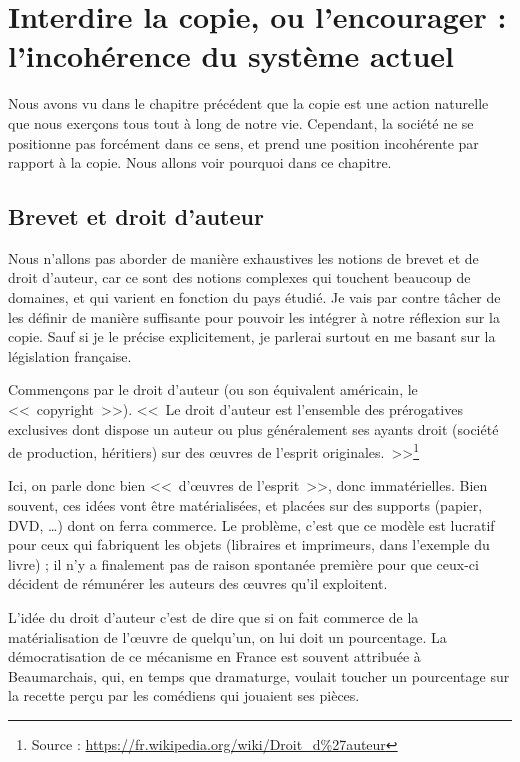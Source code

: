 \chapter{Interdire la copie, ou l'encourager : l'incohérence du système actuel}

Nous avons vu dans le chapitre précédent que la copie est une action naturelle que nous exerçons tous tout à long de notre vie.
Cependant, la société ne se positionne pas forcément dans ce sens, et prend une position incohérente par rapport à la copie.
Nous allons voir pourquoi dans ce chapitre.

\section{Brevet et droit d'auteur}

Nous n'allons pas aborder de manière exhaustives les notions de brevet et de droit d'auteur, car ce sont des notions complexes qui touchent beaucoup de domaines, et qui varient en fonction du pays étudié.
Je vais par contre tâcher de les définir de manière suffisante pour pouvoir les intégrer à notre réflexion sur la copie.
Sauf si je le précise explicitement, je parlerai surtout en me basant sur la législation française.

Commençons par le droit d'auteur (ou son équivalent américain, le <<~copyright~>>).
<<~Le droit d'auteur est l'ensemble des prérogatives exclusives dont dispose un auteur ou plus généralement ses ayants droit (société de production, héritiers) sur des œuvres de l'esprit originales.~>>\footnote{Source : \url{https://fr.wikipedia.org/wiki/Droit_d\%27auteur}}

Ici, on parle donc bien <<~d'œuvres de l'esprit~>>, donc immatérielles.
Bien souvent, ces idées vont être matérialisées, et placées sur des supports (papier, DVD, \dots{}) dont on ferra commerce.
Le problème, c'est que ce modèle est lucratif pour ceux qui fabriquent les objets (libraires et imprimeurs, dans l'exemple du livre) ; il n'y a finalement pas de raison spontanée première pour que ceux-ci décident de rémunérer les auteurs des œuvres qu'il exploitent.

L'idée du droit d'auteur c'est de dire que si on fait commerce de la matérialisation de l'œuvre de quelqu'un, on lui doit un pourcentage.
La démocratisation de ce mécanisme en France est souvent attribuée à Beaumarchais, qui, en temps que dramaturge, voulait toucher un pourcentage sur la recette perçu par les comédiens qui jouaient ses pièces.

